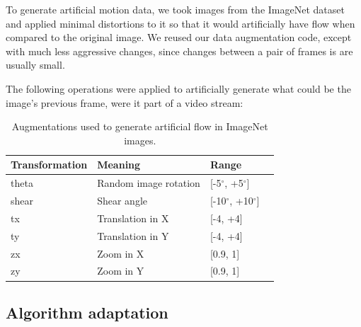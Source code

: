 \documentclass[12pt,openright,twoside,a4paper,english]{abntex2}
\begin{document}
\begin{otherlanguage}{english}
To generate artificial motion data, we took images from the ImageNet dataset and applied minimal distortions to it so that it would artificially have flow when compared to the original image. We reused our data augmentation code, except with much less aggressive changes, since changes between a pair of frames is are usually small.

The following operations were applied to artificially generate what could be the image's previous frame, were it part of a video stream:

\begin{table}[H]
    \centering
    \begin{tabular}{llll}
    Transformation & Meaning               & Range          &  \\ \hline
    theta          & Random image rotation & [-5$^{\circ}$, +5$^{\circ}$]   &  \\
    shear          & Shear angle           & [-10$^{\circ}$, +10$^{\circ}$] &  \\ \hline
    tx             & Translation in X      & [-4, +4]       &  \\
    ty             & Translation in Y      & [-4, +4]       &  \\ \hline
    zx             & Zoom in X             & [0.9, 1]       &  \\
    zy             & Zoom in Y             & [0.9, 1]       &  \\ \hline
    \end{tabular}
    \label{table:augmentations_imagenet}
    \caption{Augmentations used to generate artificial flow in ImageNet images.}
\end{table}




\subsection{Algorithm adaptation}




\end{otherlanguage}
\end{document}
